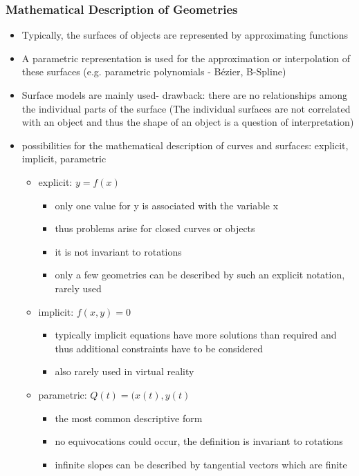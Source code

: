 \documentclass{standalone}
\begin{document}
\subsubsection*{Mathematical Description of Geometries}

\begin{itemize}
	\item Typically, the surfaces of objects are represented by approximating functions
	\item A parametric representation is used for the approximation or interpolation of these surfaces (e.g. parametric polynomials - B\'ezier, B-Spline)
	\item Surface models are mainly used- drawback: there are no relationships among the individual parts of the surface (The individual surfaces are not correlated with an object and thus the shape of an object is a question of interpretation)
	\item possibilities for the mathematical description of curves and surfaces: explicit, implicit, parametric
	\begin{itemize}
		\item explicit: $y = f(x)$
		\begin{itemize}
		  	\item only one value for y is associated with the variable x
		  	\item thus problems arise for closed curves or objects
		  	\item it is not invariant to rotations
		  	\item only a few geometries can be described by such an explicit notation, rarely used
		\end{itemize}
		\item implicit: $f(x, y) = 0$
		\begin{itemize} 
			\item typically implicit equations have more solutions than required and thus additional constraints have to be considered 
			\item also rarely used in virtual reality
		\end{itemize}
		\item parametric: $Q(t) = (x(t), y(t)$
		\begin{itemize}
			\item the most common descriptive form
			\item no equivocations could occur, the definition is invariant to rotations
			\item infinite slopes can be described by tangential vectors which are finite

\end{itemize}
\end{itemize}
\end{itemize}
\end{document}
